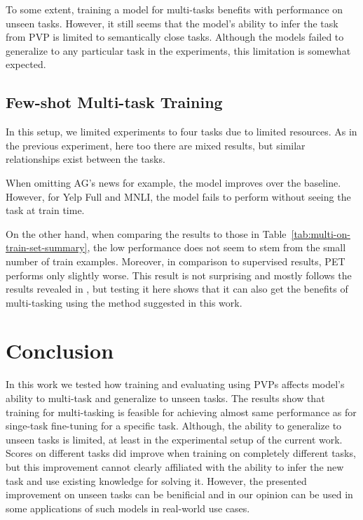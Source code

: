 \documentclass[11pt,a4paper]{article}
\begin{document}
To some extent, training a model for multi-tasks benefits with performance on unseen tasks.
However, it still seems that the model's ability to infer the task from PVP is limited to semantically close tasks.
Although the models failed to generalize to any particular task in the experiments, this limitation is somewhat expected.

\subsection{Few-shot Multi-task Training}
In this setup, we limited experiments to four tasks due to limited resources.
As in the previous experiment, here too there are mixed results, but similar relationships exist between the tasks.

When omitting AG's news for example, the model improves over the baseline.
However, for Yelp Full and MNLI, the model fails to perform without seeing the task at train time.

On the other hand, when comparing the results to those in Table~\ref{tab:multi-on-train-set-summary},
the low performance does not seem to stem from the small number of train examples.
Moreover, in comparison to supervised results, PET performs only slightly worse.
This result is not surprising and mostly follows the results revealed in \citet{schick2020exploiting}, but testing it here shows that it can also get the benefits of multi-tasking using the method suggested in this work.

\section{Conclusion}
In this work we tested how training and evaluating using PVPs affects model's ability to multi-task and generalize to unseen tasks.
The results show that training for multi-tasking is feasible for achieving almost same performance as for singe-task fine-tuning for a specific task.
Although, the ability to generalize to unseen tasks is limited, at least in the experimental setup of the current work.
Scores on different tasks did improve when training on completely different tasks, but this improvement cannot clearly affiliated with the ability to infer the new task and use existing knowledge for solving it. 
However, the presented improvement on unseen tasks can be benificial and in our opinion can be used in some applications of such models in real-world use cases. 

\nocite{*}


\end{document}
